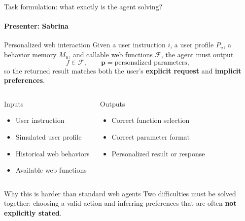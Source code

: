 \documentclass[10pt]{beamer}
\newcommand{\speaker}[1]{\framesubtitle{Presenter: #1}}
\begin{document}
\begin{frame}{Task formulation: what exactly is the agent solving?}
  \speaker{Sabrina}
  \begin{block}{Personalized web interaction}
    \scriptsize
    Given a user instruction $i$, a user profile $P_u$, a behavior memory $M_u$, and callable web functions $\mathcal{F}$, the agent must output
    \[
      f \in \mathcal{F}, \qquad \mathbf{p} = \text{personalized parameters},
    \]
    so the returned result matches both the user's \textbf{explicit request} and \textbf{implicit preferences}.
  \end{block}
  \begin{columns}[T,onlytextwidth]
      \begin{block}{Inputs}
        \small
        \begin{itemize}\itemsep0.15em
          \item User instruction
          \item Simulated user profile
          \item Historical web behaviors
          \item Available web functions
        \end{itemize}
      \end{block}
      \begin{block}{Outputs}
        \small
        \begin{itemize}\itemsep0.15em
          \item Correct function selection
          \item Correct parameter format
          \item Personalized result or response
        \end{itemize}
      \end{block}
  \end{columns}
  \begin{alertblock}{Why this is harder than standard web agents}
    \scriptsize Two difficulties must be solved together: choosing a valid action and inferring preferences that are often \textbf{not explicitly stated}.
  \end{alertblock}
\end{frame}
\end{document}

